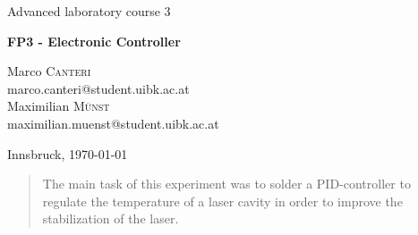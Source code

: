 \documentclass[a4paper,10pt]{article}
\begin{document}
\begin{titlepage}
 \begin{center}
	\Large{Advanced laboratory course 3}
	\end{center}
	\begin{center}
	 \LARGE{\textbf{FP3 - Electronic Controller}}
	\end{center}

	\begin{center}

	\large Marco \textsc{Canteri} \\
	marco.canteri@student.uibk.ac.at\\
	\large Maximilian \textsc{Münst} \\
	maximilian.muenst@student.uibk.ac.at
	\end{center}

	\begin{center}
	\vspace{1cm}
	Innsbruck, \today
	\vspace{1cm}
	\end{center}

	\begin{abstract}
    The main task of this experiment was to solder a PID-controller to regulate the temperature of a laser cavity in order to improve the stabilization of the laser.
  \end{abstract}
    \vspace{1cm}


\end{titlepage}
\end{document}
